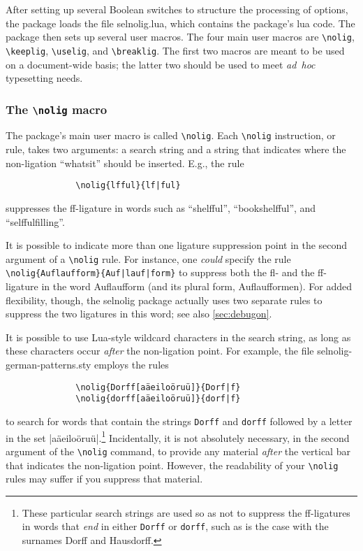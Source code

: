 \documentclass[11pt]{article}
\newcommand{\pkg}[1]{\textsf{#1}}
\newcommand{\opt}[1]{\texttt{#1}}
\newcommand{\cmmd}[1]{\texttt{\textbackslash #1}}
\begin{document}
After setting up several Boolean switches to structure the processing of options, the package loads the file \pkg{selnolig.lua}, which contains the package's lua code. The package then sets up several user macros. The four main user macros are \cmmd{nolig}, \cmmd{keeplig}, \cmmd{uselig}, and \cmmd{breaklig}. The first two macros are meant to be used on a document-wide basis; the latter two should be used to meet \emph{ad~hoc} typesetting needs.



\subsubsection{The \cmmd{nolig} macro}
\label{sec:nolig}

The package's main user macro is called \cmmd{nolig}. Each \cmmd{nolig} instruction, or rule, takes two arguments: a search string and a string that indicates where the non-ligation \enquote{whatsit} should be inserted. E.g., the rule
\begin{Verbatim}
              \nolig{lfful}{lf|ful}
\end{Verbatim}
suppresses the ff-ligature in words such as \enquote{shelfful}, \enquote{bookshelfful}, and \enquote{selffulfilling}.

It is possible to indicate more than one ligature suppression point in the second argument of a \cmmd{nolig} rule. For instance, one \emph{could} specify the rule \Verb+\nolig{Auflaufform}{Auf|lauf|form}+ to suppress both the fl- and the ff-ligature in the word Auflaufform (and its plural form, Auflaufformen). For added flexibility, though, the \pkg{selnolig} package actually uses two separate rules to suppress the two ligatures in this word; see also \cref{sec:debugon}.


It is possible to use Lua-style wildcard characters in the search string, as long as these characters occur \emph{after} the non-ligation point. For example, the file \pkg{selnolig-german-patterns.sty} employs the rules 
\begin{Verbatim}
              \nolig{Dorff[aäeiloöruü]}{Dorf|f}
              \nolig{dorff[aäeiloöruü]}{dorf|f}
\end{Verbatim}
to search for words that contain the strings \opt{Dorff} and \opt{dorff} followed by a letter in the set |aäeiloöruü|.\footnote{These particular search strings are used so as not to suppress the ff-ligatures in words that \emph{end} in either \opt{Dorff} or \opt{dorff}, such as is the case with the surnames Dorff and Hausdorff.} Incidentally, it is not absolutely necessary, in the second argument of the \cmmd{nolig} command, to provide any material \emph{after} the vertical bar that indicates the non-ligation point. However, the readability of your \cmmd{nolig} rules may suffer if you suppress that material.
\end{document}
